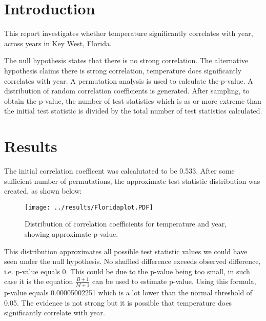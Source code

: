 \documentclass[11pt]{article}
\title{\vspace{-1.5cm}{Is Florida getting warmer?}}
\author{An Nguyen}
\date{\today}
\begin{document}
\maketitle

\section{Introduction}
This report investigates whether temperature significantly correlates with year, across years in Key West, Florida. 

The null hypothesis states that there is no strong correlation. The alternative hypothesis claims there is strong correlation, temperature does significantly correlates with year. A permutation analysis is used to calculate the p-value. A distribution of random correlation coefficients is generated. After sampling, to obtain the p-value, the number of test statistics which is as or more extreme than the initial test statistic is divided by the total number of test statistics calculated.

\section{Results}
The initial correlation coefficent was calcalutated to be 0.533. After some sufficient number of permutations, the approximate test statistic distribution was created, as shown below: 

\begin{figure}[H]
\texttt{[image: ../results/Floridaplot.PDF]}
\centering
\caption{Distribution of correlation coefficients for temperature and year, showing approximate p-value.}
\end{figure}

This distribution approximates all possible test statistic values we could have seen under the null hypothesis. No shuffled difference exceeds observed difference, i.e. p-value equals 0. This could be due to the p-value being too small, in such case it is the equation $\frac{B+1}{M+1}$ can be used to estimate p-value. Using this formula, p-value equals 0.00005002251 which is a lot lower than the normal threshold of 0.05. The evidence is not strong but it is possible that temperature does significantly correlate with year. 
\end{document}
